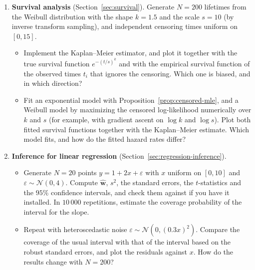 \documentclass[11pt]{article}
\newcommand{\py}[1]{\texttt{\detokenize{#1}}}
\theoremstyle{definition}
\theoremstyle{plain}
\theoremstyle{remark}
\begin{document}
\begin{enumerate}[label=\textbf{P\arabic*.}, leftmargin=*]
    \item \textbf{Survival analysis} (Section~\ref{sec:survival}). Generate $N = 200$ lifetimes from the Weibull distribution with the shape $k = 1.5$ and the scale $s = 10$ (by inverse transform sampling), and independent censoring times uniform on $[0, 15]$.
    \begin{itemize}
        \item Implement the Kaplan--Meier estimator, and plot it together with the true survival function $e^{-(t/s)^k}$ and with the empirical survival function of the observed times $t_i$ that ignores the censoring. Which one is biased, and in which direction?
        \item Fit an exponential model with Proposition~\ref{prop:censored-mle}, and a Weibull model by maximizing the censored log-likelihood numerically over $k$ and $s$ (for example, with gradient ascent on $\log k$ and $\log s$). Plot both fitted survival functions together with the Kaplan--Meier estimate. Which model fits, and how do the fitted hazard rates differ?
    \end{itemize}

    \item \textbf{Inference for linear regression} (Section~\ref{sec:regression-inference}).
    \begin{itemize}
        \item Generate $N = 20$ points $y = 1 + 2x + \varepsilon$ with $x$ uniform on $[0, 10]$ and $\varepsilon \sim \mathcal{N}(0, 4)$. Compute $\hat{\mathbf{w}}$, $s^2$, the standard errors, the $t$-statistics and the $95\%$ confidence intervals, and check them against \py{statsmodels} if you have it installed. In $10\,000$ repetitions, estimate the coverage probability of the interval for the slope.
        \item Repeat with heteroscedastic noise $\varepsilon \sim \mathcal{N}(0, (0.3x)^2)$. Compare the coverage of the usual interval with that of the interval based on the robust standard errors, and plot the residuals against $x$. How do the results change with $N = 200$?
    \end{itemize}
\end{enumerate}
\end{document}
